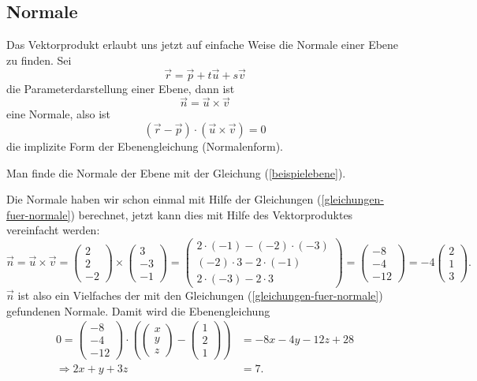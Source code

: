 \subsection{Normale}
Das Vektorprodukt erlaubt uns jetzt auf einfache Weise die Normale einer
Ebene zu finden.
Sei
\[
\vec r=\vec p+t\vec u+s\vec v
\]
die Parameterdarstellung einer Ebene, dann ist
\[
\vec n=\vec u\times\vec v
\]
eine Normale, also ist
\[
(\vec r-\vec p)\cdot (\vec u\times\vec v)=0
\]
die implizite Form der Ebenengleichung (Normalenform).

\begin{beispiel}
Man finde die Normale der Ebene mit der Gleichung (\ref{beispielebene}).

\smallskip
{\parindent 0pt Die Normale haben wir schon einmal mit Hilfe der Gleichungen
(\ref{gleichungen-fuer-normale}) berechnet, jetzt kann dies
mit Hilfe des Vektorproduktes vereinfacht werden:}
\begin{equation}
\vec n = \vec u\times \vec v=
\begin{pmatrix}2\\2\\-2\end{pmatrix}
\times
\begin{pmatrix}3\\-3\\-1\end{pmatrix}
=
\begin{pmatrix}
2\cdot(-1)-(-2)\cdot(-3)\\
(-2)\cdot 3-2\cdot (-1)\\
2\cdot(-3)-2\cdot 3
\end{pmatrix}
=
\begin{pmatrix}
-8\\
-4\\
-12
\end{pmatrix}
=-4\begin{pmatrix}2\\1\\3\end{pmatrix}.
\label{beispielvektorprodukt}
\end{equation}
$\vec{n}$ ist
also ein Vielfaches der mit den Gleichungen (\ref{gleichungen-fuer-normale})
gefundenen Normale.
Damit wird die Ebenengleichung
\begin{align*}
0=
\begin{pmatrix} -8\\ -4\\ -12 \end{pmatrix}\cdot
\left(
\begin{pmatrix}x\\y\\z\end{pmatrix}
-
\begin{pmatrix}1\\2\\1 \end{pmatrix}
\right)
&=
-8x-4y-12z+
28
\\
\Rightarrow
2x+y+3z&=7.
\end{align*}
\end{beispiel}

